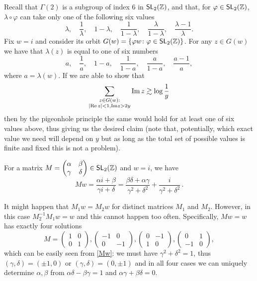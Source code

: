 \documentclass[12pt]{paper}
\newcommand{\bZ}{\mathbb Z}
\renewcommand{\phi}{\varphi}
\begin{document}
Recall that $\Gamma (2)$ is a subgroup of index $6$ in 
${\sf SL}_2(\bZ)$, and that, for $\phi\in {\sf SL}_2(\bZ)$, $\lambda \circ \phi$ can take 
only one of the following six values
\[
\lambda,  \quad \frac1{\lambda}, \quad 1-\lambda, \quad  
\frac1{1-\lambda}, \quad \frac{\lambda}{1-\lambda}, \quad \frac{\lambda-1}\lambda.
\]
Fix $w=i$ and consider its orbit $G(w)=\{\phi w\colon \phi\in {\sf SL}_2(\bZ)\}$. For any $z\in G(w)$ we have that $\lambda(z)$ is equal to one of six numbers \[
a,  \quad \frac1a, \quad 1-a, \quad  
\frac1{1-a}, \quad \frac{a}{1-a}, \quad \frac{a-1}a,
\] 
where $a = \lambda(w)$. If we are able to show that
$$\sum_{\substack{z\in G(w):\\ |{\rm Re}\,z| < 1, {\rm Im}z > 2y}}{\rm Im}\,z \gtrsim \log \frac{1}{y}$$
then by the pigeonhole principle the same would hold for at least one of six values above, thus giving us the desired claim (note that, potentially, which exact value we need will depend on $y$ but as long as the total set of possible values is finite and fixed this is not a problem).

For a matrix $M = \left( \begin{matrix}
\alpha & \beta \\
\gamma & \delta
\end{matrix} \right)\in {\sf SL}_2(\bZ)$ and $w=i$, we have 
\begin{equation}\label{Mw}
Mw =  \frac{\alpha i + \beta}{\gamma i + \delta} 
= \frac{\beta \delta + \alpha \gamma}{\gamma^2 + \delta^2} + \frac{i}{\gamma^2 + \delta^2}\,.
\end{equation}

It might happen that $M_1w = M_2w$ for distinct matrices $M_1$ and $M_2$. However, in this case $M_2^{-1}M_1 w =w$ and this cannot happen too often. Specifically, $Mw = w$ has exactly four solutions
$$M = \left( \begin{matrix}
1 & 0 \\
0 & 1
\end{matrix} \right), \left( \begin{matrix}
-1 & 0 \\
0 & -1
\end{matrix} \right), \left( \begin{matrix}
0 & -1 \\
1 & 0
\end{matrix} \right), \left( \begin{matrix}
0 & 1 \\
-1 & 0
\end{matrix} \right),$$
which can be easily seen from \eqref{Mw}: we must have $\gamma^2+\delta^2 = 1$, thus $(\gamma, \delta) = (\pm 1, 0)$ or $(\gamma, \delta) = (0, \pm 1)$ and in all four cases we can uniquely determine $\alpha, \beta$ from $\alpha\delta - \beta\gamma = 1$ and $\alpha\gamma + \beta\delta = 0$.
\end{document}
